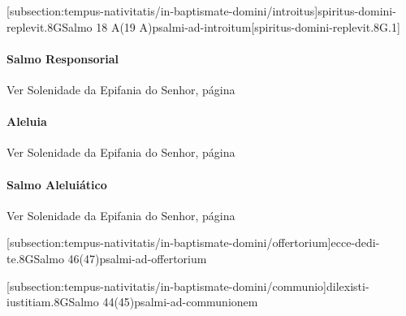 \def\Prefix{subsection:tempus-nativitatis/in-baptismate-domini}

[\Prefix/introitus]{spiritus-domini-replevit.8G}{Salmo 18 A(19 A)}{psalmi-ad-introitum}[spiritus-domini-replevit.8G.1]

\AllowPageFlush

\paragraph{Salmo Responsorial}
\begin{rubrica}
  Ver Solenidade da Epifania do Senhor, página~\pageref{subsection:tempus-nativitatis/in-epiphania-domini/psalmus-responsorius}
\end{rubrica}

\paragraph{Aleluia}
\begin{rubrica}
  Ver Solenidade da Epifania do Senhor, página~\pageref{subsection:tempus-nativitatis/in-epiphania-domini/alleluia}
\end{rubrica}

\paragraph{Salmo Aleluiático}
\begin{rubrica}
  Ver Solenidade da Epifania do Senhor, página~\pageref{subsection:tempus-nativitatis/in-epiphania-domini/psalmus-alleluiaticus}
\end{rubrica}

\AllowPageFlush

[\Prefix/offertorium]{ecce-dedi-te.8G}{Salmo 46(47)}{psalmi-ad-offertorium}

\AllowPageBreak

[\Prefix/communio]{dilexisti-iustitiam.8G}{Salmo 44(45)}{psalmi-ad-communionem}